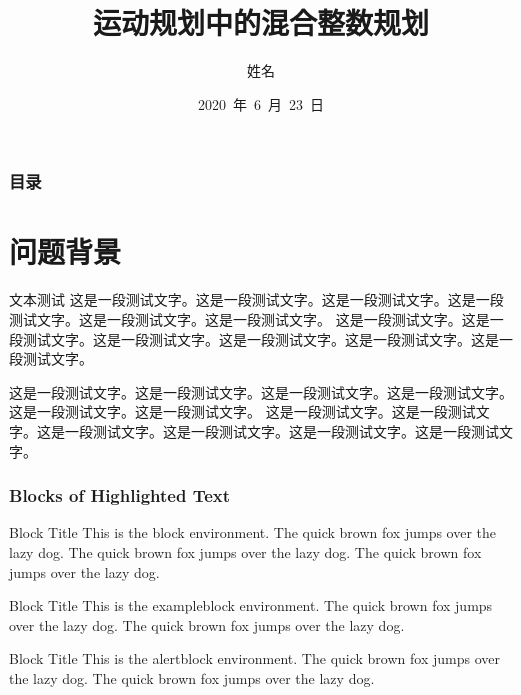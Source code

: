 \documentclass[notheorems,11pt]{beamer}
\title[Short 题目]{运动规划中的混合整数规划} %
\author{姓名}  %
\institute[NU] %
{
Name of University \\ %
\medskip
\textit{name@email.com} %
}
\date[2020.6.23]{2020~年~6~月~23~日} %
\theoremstyle{plain}
\numberwithin{theorem}{section}
\numberwithin{definition}{section}
\numberwithin{lemma}{section}
\numberwithin{proposition}{section}
\numberwithin{corollary}{section}
\theoremstyle{example}
\numberwithin{figure}{section}
\numberwithin{table}{section}
\numberwithin{equation}{section}
\begin{document}

\begin{frame}
\titlepage
\end{frame}

\begin{frame}
\frametitle{目录}
\tableofcontents
\end{frame}


\section{问题背景}

\begin{frame}{文本测试}
这是一段测试文字。这是一段测试文字。这是一段测试文字。这是一段测试文字。这是一段测试文字。这是一段测试文字。
这是一段测试文字。这是一段测试文字。这是一段测试文字。这是一段测试文字。这是一段测试文字。这是一段测试文字。

\vspace{1ex}
这是一段测试文字。这是一段测试文字。这是一段测试文字。这是一段测试文字。这是一段测试文字。这是一段测试文字。
这是一段测试文字。这是一段测试文字。这是一段测试文字。这是一段测试文字。这是一段测试文字。这是一段测试文字。

\end{frame}


\begin{frame}
\frametitle{Blocks of Highlighted Text}
\begin{block}{Block Title}
This is the block environment. The quick brown fox jumps over the lazy dog. The quick brown fox jumps over the lazy dog. The quick brown fox jumps over the lazy dog.
\end{block}

\begin{exampleblock}{Block Title}
This is the exampleblock environment. The quick brown fox jumps over the lazy dog. The quick brown fox jumps over the lazy dog.
\end{exampleblock}

\begin{alertblock}{Block Title}
This is the alertblock environment. The quick brown fox jumps over the lazy dog. The quick brown fox jumps over the lazy dog.
\end{alertblock}
\end{frame}
\end{document}
